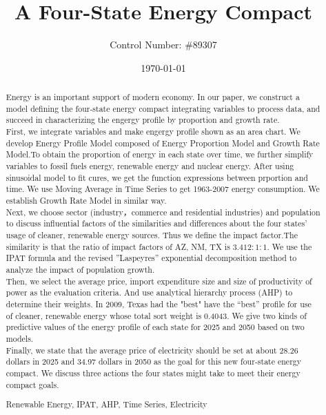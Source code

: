 \documentclass{mcmthesis}
\title{\textbf{A Four-State Energy Compact}}
\author{\small Control Number: \#89307}
\date{\today}
\begin{document}
\begin{abstract}
Energy is an important support of modern economy. In our paper, we construct a model defining the four-state energy compact integrating variables to process data, and succeed in characterizing the engergy profile by proportion and growth rate.\\
First, we integrate variables and make engergy profile shown as an area chart. We develop Energy Profile Model composed of Energy Proportion Model and Growth Rate Model.To obtain the proportion of energy in each state over time, we further simplify variables to fossil fuels energy, renewable energy and nuclear energy. After using sinusoidal model to fit cures, we get the function expressions between prportion and time. We use Moving Average in Time Series to get 1963-2007 energy consumption. We establish Growth Rate Model in similar way.\\
Next, we choose sector (industry，commerce and
residential industries) and population to discuss influential factors of the similarities and differences about the four states’ usage of cleaner, renewable energy sources. Thus we define the impact factor.The similarity is that the ratio of impact factors of AZ, NM, TX is $ 3.412 : 1 : 1 $. We use the IPAT formula and the revised ”Laspeyres” exponential decomposition method to analyze the impact of population growth.\\
Then, we select the average price, import expenditure size and size of productivity of power as the evaluation criteria. And use analytical hierarchy process (AHP) to determine their weights. In 2009, Texas had the "best" have the “best” profile for use of cleaner, renewable energy whose total sort weight is 0.4043. We give two kinds of predictive values of the energy profile of each state for 2025 and 2050 based on two models.\\
Finally, we state that the average price of electricity should be set at about 28.26 dollars in 2025 and 34.97 dollars in 2050 as the goal for this new four-state energy compact.
We discuss three actions the four states might take to meet their energy
compact goals.
\begin{keywords}
Renewable Energy, IPAT, AHP, Time Series, Electricity
\end{keywords}
\end{abstract}
\maketitle
\tableofcontents
\end{document}
